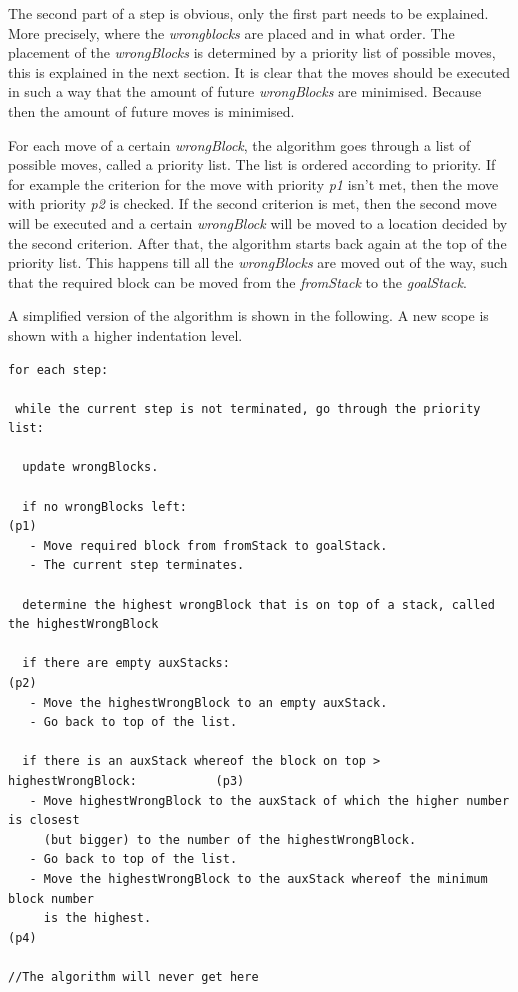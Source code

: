 \documentclass{article}
\begin{document}
	\par The second part of a step is obvious, only the first part needs to be explained. More precisely, where the \textit{wrongblocks} are placed and in what order. The placement of the \textit{wrongBlocks} is determined by a priority list of possible moves, this is explained in the next section. It is clear that the moves should be executed in such a way that the amount of future \textit{wrongBlocks} are minimised. Because then the amount of future moves is minimised.
	
	\par For each move of a certain \textit{wrongBlock}, the algorithm goes through a list of possible moves, called a priority list. The list is ordered according to priority. If for example the criterion for the move with priority \textit{p1} isn't met, then the move with priority \textit{p2} is checked. If the second criterion is met, then the second move will be executed and a certain \textit{wrongBlock} will be moved to a location decided by the second criterion. After that, the algorithm starts back again at the top of the priority list. This happens till all the \textit{wrongBlocks} are moved out of the way, such that the required block can be moved from the \textit{fromStack} to the \textit{goalStack}.
	
	\par A simplified version of the algorithm is shown in the following. A new scope is shown with a higher indentation level.
	
	\par
\begin{Verbatim}[fontsize=\small]
for each step:

 while the current step is not terminated, go through the priority list:

  update wrongBlocks.

  if no wrongBlocks left:                                                         (p1)     
   - Move required block from fromStack to goalStack.
   - The current step terminates.

  determine the highest wrongBlock that is on top of a stack, called the highestWrongBlock

  if there are empty auxStacks:                                                   (p2)                               
   - Move the highestWrongBlock to an empty auxStack.
   - Go back to top of the list.	

  if there is an auxStack whereof the block on top > highestWrongBlock:           (p3) 
   - Move highestWrongBlock to the auxStack of which the higher number is closest 
     (but bigger) to the number of the highestWrongBlock.
   - Go back to top of the list.
   - Move the highestWrongBlock to the auxStack whereof the minimum block number   
     is the highest.                                                              (p4)  

//The algorithm will never get here
\end{Verbatim}
	
\end{document}
